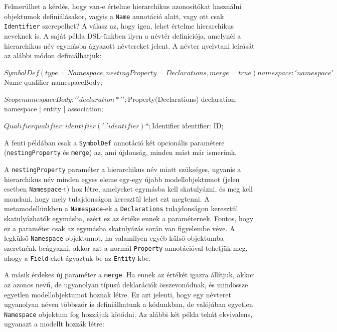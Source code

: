 \documentclass[12pt, a4paper]{report}
\newcommand{\f}[1]{\texttt{#1}}
\begin{document}
Felmerülhet a kérdés, hogy van-e értelme hierarchikus azonosítókat használni objektumok definiálásakor, vagyis a \f{Name} annotáció alatt, vagy ott csak \f{Identifier} szerepelhet? A válasz az, hogy igen, lehet értelme hierarchikus neveknek is. A saját példa DSL-ünkben ilyen a névtér definíciója, amelynél a hierarchikus név egymásba ágyazott névtereket jelent. A névter nyelvtani leírását az alábbi módon definiálhatjuk:

\begin{antlr4code}
$SymbolDef(type=Namespace,nestingProperty=Declarations,merge=true)
namespace: 'namespace' $Name qualifier namespaceBody;

$Scope
namespaceBody: '{' declaration* '}';

$Property(Declarations)
declaration: namespace | entity | association;

$Qualifier
qualifier: identifier ('.' identifier)*;

$Identifier
identifier: ID;
\end{antlr4code}

A fenti példában csak a \f{SymbolDef} annotáció két opcionális paramétere (\f{nestingProperty} és \f{merge}) az, ami újdonság, minden mást már ismerünk.

A \f{nestingProperty} paraméter a hierarchikus név miatt szükséges, ugyanis a hierarchikus név minden egyes eleme egy-egy újabb modellobjektumot (jelen esetben \f{Namespace}-t) hoz létre, amelyeket egymásba kell skatulyázni, és meg kell mondani, hogy mely tulajdonságon keresztül lehet ezt megtenni. A metamodellünkben a \f{Namespace}-ek a \f{Declarations} tulajdonságon keresztül skatulyázhatók egymásba, ezért ez az értéke ennek a paraméternek. Fontos, hogy ez a paraméter csak az egymásba skatulyázás során van figyelembe véve. A legkülső \f{Namespace} objektumot, ha valamilyen egyéb külső objektumba szeretnénk beágyazni, akkor azt a normál \f{Property} annotációval tehetjük meg, ahogy a \f{Field}-eket ágyaztuk be az \f{Entity}-kbe.

A másik érdekes új paraméter a \f{merge}. Ha ennek az értékét igazra állítjuk, akkor az azonos nevű, de ugyanolyan típusú deklarációk összevonódnak, és mindössze egyetlen modellobjektumot hoznak létre. Ez azt jelenti, hogy egy névteret ugyanolyan néven többször is definiálhatunk a kódunkban, de valójában egyetlen \f{Namespace} objektum fog hozzájuk kötődni. Az alábbi két példa tehát ekvivalens, ugyanazt a modellt hozzák létre:

\end{document}
